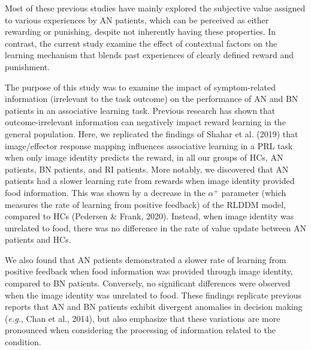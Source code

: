 \documentclass[
  man,floatsintext]{apa6}
\begin{document}
Most of these previous studies have mainly explored the subjective value assigned to various experiences by AN patients, which can be perceived as either rewarding or punishing, despite not inherently having these properties. In contrast, the current study examine the effect of contextual factors on the learning mechanism that blends past experiences of clearly defined reward and punishment.

The purpose of this study was to examine the impact of symptom-related information (irrelevant to the task outcome) on the performance of AN and BN patients in an associative learning task. Previous research has shown that outcome-irrelevant information can negatively impact reward learning in the general population. Here, we replicated the findings of Shahar et al. (2019) that image/effector response mapping influences associative learning in a PRL task when only image identity predicts the reward, in all our groups of HCs, AN patients, BN patients, and RI patients. More notably, we discovered that AN patients had a slower learning rate from rewards when image identity provided food information. This was shown by a decrease in the \(\alpha^+\) parameter (which measures the rate of learning from positive feedback) of the RLDDM model, compared to HCs (Pedersen \& Frank, 2020). Instead, when image identity was unrelated to food, there was no difference in the rate of value update between AN patients and HCs.

We also found that AN patients demonstrated a slower rate of learning from positive feedback when food information was provided through image identity, compared to BN patients. Conversely, no significant differences were observed when the image identity was unrelated to food. These findings replicate previous reports that AN and BN patients exhibit divergent anomalies in decision making (\emph{e.g.}, Chan et al., 2014), but also emphasize that these variations are more pronounced when considering the processing of information related to the condition.
\end{document}
